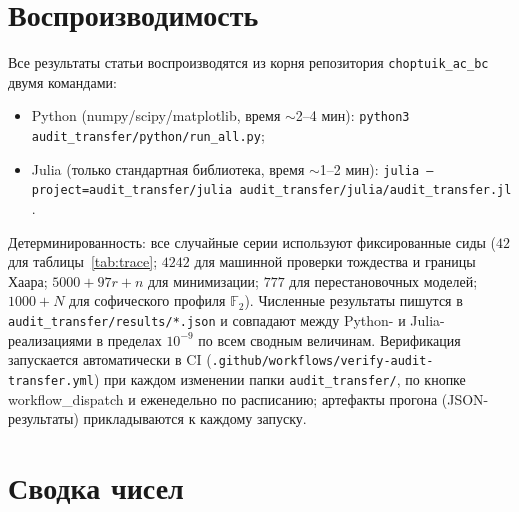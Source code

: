 \documentclass[11pt,a4paper]{article}
\theoremstyle{plain}
\theoremstyle{definition}
\theoremstyle{remark}
\begin{document}
\appendix

\section{Воспроизводимость}\label{app:repro}

Все результаты статьи воспроизводятся из корня репозитория
\texttt{choptuik\_ac\_bc} двумя командами:
\begin{sloppypar}
\begin{itemize}
\item Python (numpy/scipy/matplotlib, время $\sim$2--4 мин):
\texttt{python3 audit\_transfer/python/run\_all.py};
\item Julia (только стандартная библиотека, время $\sim$1--2 мин):
\texttt{julia --project=audit\_transfer/julia\ audit\_transfer/julia/audit\_transfer.jl}.
\end{itemize}
\end{sloppypar}

Детерминированность: все случайные серии используют фиксированные сиды
($42$ для таблицы~\ref{tab:trace}; $4242$ для машинной проверки
тождества и границы Хаара; $5000+97r+n$ для минимизации; $777$ для
перестановочных моделей; $1000+N$ для софического профиля
$\mathbb{F}_2$). Численные результаты пишутся в
\texttt{audit\_transfer/results/*.json} и совпадают между Python- и
Julia-реализациями в пределах $10^{-9}$ по всем сводным величинам.
Верификация запускается автоматически в CI
(\texttt{.github/workflows/verify-audit-transfer.yml}) при каждом
изменении папки \texttt{audit\_transfer/}, по кнопке workflow\_dispatch
и еженедельно по расписанию; артефакты прогона (JSON-результаты)
прикладываются к каждому запуску.

\section{Сводка чисел}\label{app:numbers}
\end{document}

